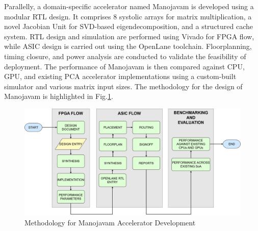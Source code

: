 Parallelly, a domain-specific accelerator named Manojavam is developed using a modular RTL design. It comprises 8 systolic arrays for matrix multiplication, a novel Jacobian Unit for SVD-based eigendecomposition, and a structured cache system. RTL design and simulation are performed using Vivado for FPGA flow, while ASIC design is carried out using the OpenLane toolchain. Floorplanning, timing closure, and power analysis are conducted to validate the feasibility of deployment. The performance of Manojavam is then compared against CPU, GPU, and existing PCA accelerator implementations using a custom-built simulator and various matrix input sizes. The methodology for the design of Manojavam is highlighted in Fig.\ref{fig:manojavam_methodology}.

\begin{figure}[htbp]
	\centering
	\includegraphics[scale=0.195]{Figures/manojavam_methodology_v2.png}
	\caption{Methodology for Manojavam Accelerator Development}
	\label{fig:manojavam_methodology}
\end{figure}

